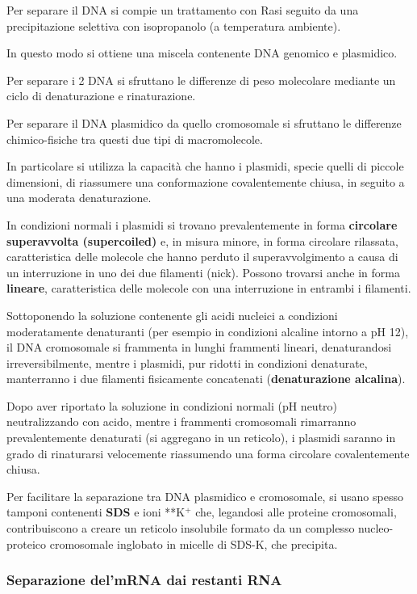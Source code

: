 \documentclass[]{article}
\begin{document}
Per separare il DNA si compie un trattamento con Rasi seguito da una
precipitazione selettiva con isopropanolo (a temperatura ambiente).

In questo modo si ottiene una miscela contenente DNA genomico e
plasmidico.

Per separare i 2 DNA si sfruttano le differenze di peso molecolare
mediante un ciclo di denaturazione e rinaturazione.

Per separare il DNA plasmidico da quello cromosomale si sfruttano le
differenze chimico-fisiche tra questi due tipi di macromolecole.

In particolare si utilizza la capacità che hanno i plasmidi, specie
quelli di piccole dimensioni, di riassumere una conformazione
covalentemente chiusa, in seguito a una moderata denaturazione.

In condizioni normali i plasmidi si trovano prevalentemente in forma
\textbf{circolare superavvolta (supercoiled)} e, in misura minore, in
forma circolare rilassata, caratteristica delle molecole che hanno
perduto il superavvolgimento a causa di un interruzione in uno dei due
filamenti (nick). Possono trovarsi anche in forma \textbf{lineare},
caratteristica delle molecole con una interruzione in entrambi i
filamenti.

Sottoponendo la soluzione contenente gli acidi nucleici a condizioni
moderatamente denaturanti (per esempio in condizioni alcaline intorno a
pH 12), il DNA cromosomale si frammenta in lunghi frammenti lineari,
denaturandosi irreversibilmente, mentre i plasmidi, pur ridotti in
condizioni denaturate, manterranno i due filamenti fisicamente
concatenati (\textbf{denaturazione alcalina}).

Dopo aver riportato la soluzione in condizioni normali (pH neutro)
neutralizzando con acido, mentre i frammenti cromosomali rimarranno
prevalentemente denaturati (si aggregano in un reticolo), i plasmidi
saranno in grado di rinaturarsi velocemente riassumendo una forma
circolare covalentemente chiusa.

Per facilitare la separazione tra DNA plasmidico e cromosomale, si usano
spesso tamponi contenenti \textbf{SDS} e ioni **K\(^+\) che, legandosi
alle proteine cromosomali, contribuiscono a creare un reticolo
insolubile formato da un complesso nucleo-proteico cromosomale inglobato
in micelle di SDS-K, che precipita.

\subsubsection{Separazione del'mRNA dai restanti
RNA}\label{separazione-delmrna-dai-restanti-rna}
\end{document}
